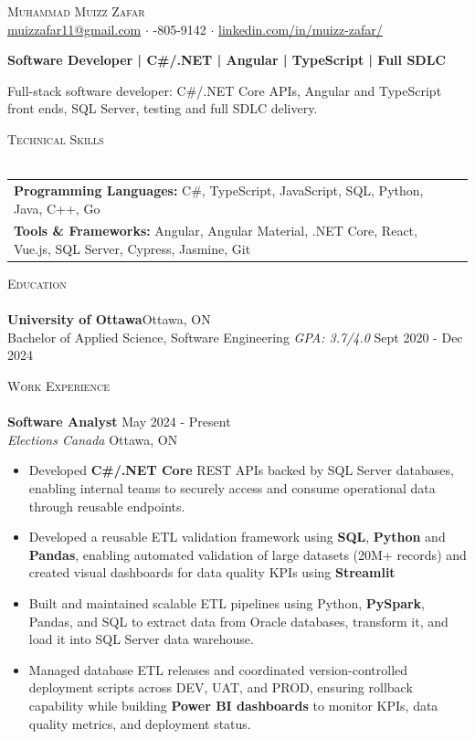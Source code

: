 \documentclass[a4paper]{article}
\newcommand{\header} [1] {
    {\hspace*{-18pt}\vspace*{6pt} \textsc{#1}}
    \vspace*{-6pt} \\
    \hspace*{-18pt} \hrulefill \\
}
\begin{document}
\vspace*{-40pt}
\vspace*{-10pt}
\begin{center}
	{\Huge \scshape {Muhammad Muizz Zafar}}\\
\faSend \space \href{mailto:muizzafar11@gmail.com}{muizzafar11@gmail.com} $\cdot$ \faPhoneSquare {}-805-9142 $\cdot$ \faLinkedinSquare \space \href{https://www.linkedin.com/in/muizz-zafar/}{linkedin.com/in/muizz-zafar/}
	\\
\end{center}
\vspace{-5pt}
\begin{center}
\textbf{Software Developer | C\#/.NET | Angular | TypeScript | Full SDLC}
\end{center}
\begin{center}
Full-stack software developer: C\#/.NET Core APIs, Angular and TypeScript front ends, SQL Server, testing and full SDLC delivery.
\end{center}
\header{Technical Skills}
\begin{tabular}{ l l }
\textbf{Programming Languages:} C\#, TypeScript, JavaScript, SQL, Python, Java, C++, Go \\
\textbf{Tools \& Frameworks:} Angular, Angular Material, .NET Core, React, Vue.js, SQL Server, Cypress, Jasmine, Git
\end{tabular}
\vspace{4mm}
\header{Education}
\textbf{University of Ottawa}\hfill Ottawa, ON\\
Bachelor of Applied Science, Software Engineering \textit{GPA: 3.7/4.0} \hfill Sept 2020 - Dec 2024\\
\vspace{4mm}
\header{Work Experience}
\textbf{Software Analyst} \hfill May 2024 - Present\\
\textit{Elections Canada} \hfill Ottawa, ON\\
\vspace{-2mm}
\begin{itemize} \itemsep -2pt
\item Developed \textbf{C\#/.NET Core} REST APIs backed by SQL Server databases, enabling internal teams to securely access and consume operational data through reusable endpoints.
\item Developed a reusable ETL validation framework using \textbf{SQL}, \textbf{Python} and \textbf{Pandas}, enabling automated validation of large datasets (20M+ records) and created visual dashboards for data quality KPIs using \textbf{Streamlit}
\item Built and maintained scalable ETL pipelines using Python, \textbf{PySpark}, Pandas, and SQL to extract data from Oracle databases, transform it, and load it into SQL Server data warehouse.
\item Managed database ETL releases and coordinated version-controlled deployment scripts across DEV, UAT, and PROD, ensuring rollback capability while building \textbf{Power BI dashboards} to monitor KPIs, data quality metrics, and deployment status.
\end{itemize}
\end{document}
